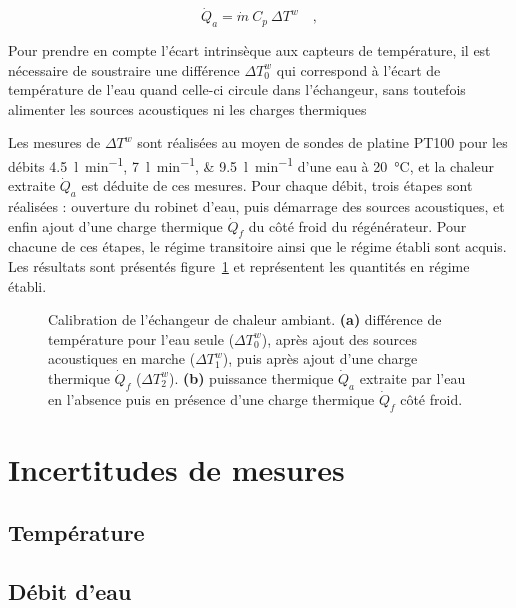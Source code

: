 \begin{equation}
    \dot Q_a = \dot m\ C_p\ \Delta T^w\quad,
    \label{eq:Qa_puissance}
\end{equation}

Pour prendre en compte l'écart intrinsèque aux capteurs de température, il est nécessaire de soustraire une différence $\Delta T_0^w$ qui correspond à l'écart de température de l'eau quand celle-ci circule dans l'échangeur, sans toutefois alimenter les sources acoustiques ni les charges thermiques\medskip

Les mesures de $\Delta T^w$ sont réalisées au moyen de sondes de platine PT100 pour les débits \qtylist{4.5;7;9.5}{\litre\per\minute} d'une eau à \qty{20}{\degreeCelsius}, et la chaleur extraite $\dot Q_a$ est déduite de ces mesures. Pour chaque débit, trois étapes sont réalisées : ouverture du robinet d'eau, puis démarrage des sources acoustiques, et enfin ajout d'une charge thermique $\dot Q_f$ du côté froid du régénérateur. Pour chacune de ces étapes, le régime transitoire ainsi que le régime établi sont acquis. Les résultats sont présentés figure~\ref{fig:AHXCalib} et représentent les quantités en régime établi. 

\begin{figure}[!ht]
    \centering
    
    \caption[Calibration de l'échangeur de chaleur ambiant.]{Calibration de l'échangeur de chaleur ambiant. \textbf{(a)} différence de température pour l'eau seule ($\Delta T_0^w$), après ajout des sources acoustiques en marche ($\Delta T_1^w$), puis après ajout d'une charge thermique $\dot Q_f$ ($\Delta T_2^w$). \textbf{(b)} puissance thermique $\dot Q_a$ extraite par l'eau en l'absence puis en présence d'une charge thermique $\dot Q_f$ côté froid.}
    \label{fig:AHXCalib}
\end{figure}




\section{Incertitudes de mesures}


\subsection{Température}

\subsection{Débit d'eau}

